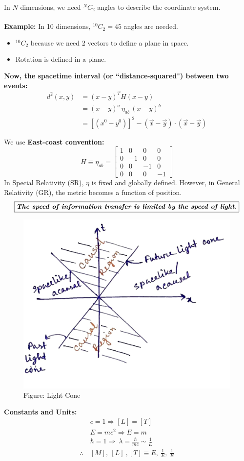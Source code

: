 \documentclass[14pt]{article} %
\begin{document}
In $N$ dimensions, we need ${}^NC_2$ angles to describe the coordinate system. \\ \\
\noindent
\textbf{Example:} In 10 dimensions, $ {}^{10}C_2 = 45 $ angles are needed.
\begin{itemize}
    \item $ {}^{10}C_2 $ because we need 2 vectors to define a plane in space.
    \item Rotation is defined in a plane.
\end{itemize}
\textbf{Now, the spacetime interval (or ``distance-squared") between two events:}
\begin{align*}
    d^2(x, y) &= (x - y)^T H (x - y) \\
    &= (x - y)^a \, \eta_{ab} \, (x - y)^b \\
    &= [(x^0 - y^0)]^2 - (\vec{x} - \vec{y}) \cdot (\vec{x} - \vec{y})
\end{align*}

We use \textbf{East-coast convention:}
\[
H \equiv \eta_{ab} = 
\begin{bmatrix}
1 & 0 & 0 & 0 \\
0 & -1 & 0 & 0 \\
0 & 0 & -1 & 0 \\
0 & 0 & 0 & -1
\end{bmatrix}
\]
In Special Relativity (SR), $\eta$ is fixed and globally defined. However, in General Relativity (GR), the metric becomes a function of position.
\vspace{0.5cm}
$$\fbox{\textbf{\textit{The speed of information transfer is limited by the speed of light.}}}$$
\begin{figure}[H]
\centering
\includegraphics[width=0.6\linewidth]{L(-1)_4.jpg}
\caption*{Figure: Light Cone}
\end{figure}
\textbf{Constants and Units:}
\begin{align*}
   & c = 1  \Rightarrow  [L] = [T] \\
   & E = mc^2 \Rightarrow E = m \\
   & \hbar = 1 \Rightarrow ~ \lambda = \frac{\hbar}{mc} \sim \frac{1}{E} \\
   \therefore~ &[M],~[L]~,[T] \equiv E,~ \frac{1}{E},~ \frac{1}{E}
\end{align*}
\end{document}
